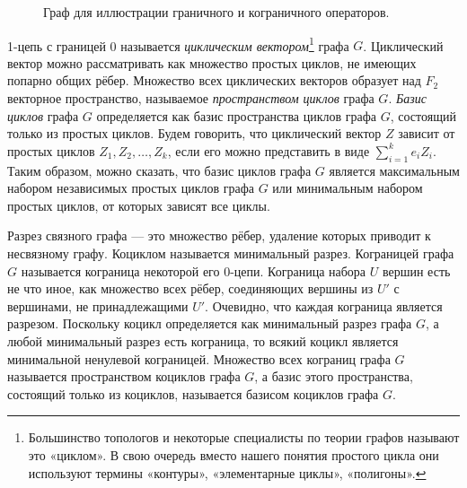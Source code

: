 \begin{figure}[h]
    \centering

    \caption{Граф для иллюстрации граничного и кограничного операторов.}
\end{figure}

1-цепь с границей 0 называется \textit{циклическим вектором}\footnote{Большинство топологов и некоторые специалисты по теории графов называют это «циклом». В свою очередь вместо нашего понятия простого цикла они используют термины «контуры», «элементарные циклы», «полигоны».} графа $G$. Циклический вектор можно рассматривать как множество простых циклов, не имеющих попарно общих рёбер. Множество всех циклических векторов образует над $F_2$ векторное пространство, называемое \textit{пространством циклов} графа $G$. \textit{Базис циклов} графа $G$ определяется как базис пространства циклов графа $G$, состоящий только из простых циклов. Будем говорить, что циклический вектор $Z$ зависит от простых циклов $Z_1, Z_2, \ldots, Z_k$, если его можно представить в виде $\sum_{i=1}^{k} e_i Z_i$. Таким образом, можно сказать, что базис циклов графа $G$ является максимальным набором независимых простых циклов графа $G$ или минимальным набором простых циклов, от которых зависят все циклы.

Разрез связного графа — это множество рёбер, удаление которых приводит к несвязному графу. Коциклом называется минимальный разрез. Кограницей графа $G$ называется кограница некоторой его 0-цепи. Кограница набора $U$ вершин есть не что иное, как множество всех рёбер, соединяющих вершины из $U'$ с вершинами, не принадлежащими $U'$. Очевидно, что каждая кограница является разрезом. Поскольку коцикл определяется как минимальный разрез графа $G$, а любой минимальный разрез есть кограница, то всякий коцикл является минимальной ненулевой кограницей. Множество всех кограниц графа $G$ называется пространством коциклов графа $G$, а базис этого пространства, состоящий только из коциклов, называется базисом коциклов графа $G$.

